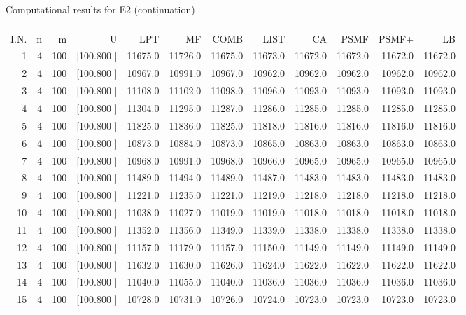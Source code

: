 \documentclass[12pt,a4paper]{article}
\begin{document}
\begin{center}
 Computational results for E2 (continuation) {\tiny
\begin{tabular}{r r r r r r r r r r r r}\hline
    &   &   &          &        &        &        &        &        &        &        &       \\[-0.1in]
  I.N.  &  n  &  m  &  U  &  LPT  &  MF  &  COMB  &  LIST  &  CA  & PSMF &PSMF+ & LB \\[0.03in]
\hline
   1&  4&100&[100.800   ]& 11675.0& 11726.0& 11675.0& 11673.0& 11672.0& 11672.0& 11672.0& 11672.0\\[-0.02in]
   2&  4&100&[100.800   ]& 10967.0& 10991.0& 10967.0& 10962.0& 10962.0& 10962.0& 10962.0& 10962.0\\[-0.02in]
   3&  4&100&[100.800   ]& 11108.0& 11102.0& 11098.0& 11096.0& 11093.0& 11093.0& 11093.0& 11093.0\\[-0.02in]
   4&  4&100&[100.800   ]& 11304.0& 11295.0& 11287.0& 11286.0& 11285.0& 11285.0& 11285.0& 11285.0\\[-0.02in]
   5&  4&100&[100.800   ]& 11825.0& 11836.0& 11825.0& 11818.0& 11816.0& 11816.0& 11816.0& 11816.0\\[-0.02in]
   6&  4&100&[100.800   ]& 10873.0& 10884.0& 10873.0& 10865.0& 10863.0& 10863.0& 10863.0& 10863.0\\[-0.02in]
   7&  4&100&[100.800   ]& 10968.0& 10991.0& 10968.0& 10966.0& 10965.0& 10965.0& 10965.0& 10965.0\\[-0.02in]
   8&  4&100&[100.800   ]& 11489.0& 11494.0& 11489.0& 11487.0& 11483.0& 11483.0& 11483.0& 11483.0\\[-0.02in]
   9&  4&100&[100.800   ]& 11221.0& 11235.0& 11221.0& 11219.0& 11218.0& 11218.0& 11218.0& 11218.0\\[-0.02in]
  10&  4&100&[100.800   ]& 11038.0& 11027.0& 11019.0& 11019.0& 11018.0& 11018.0& 11018.0& 11018.0\\[-0.02in]
  11&  4&100&[100.800   ]& 11352.0& 11356.0& 11349.0& 11339.0& 11338.0& 11338.0& 11338.0& 11338.0\\[-0.02in]
  12&  4&100&[100.800   ]& 11157.0& 11179.0& 11157.0& 11150.0& 11149.0& 11149.0& 11149.0& 11149.0\\[-0.02in]
  13&  4&100&[100.800   ]& 11632.0& 11630.0& 11626.0& 11624.0& 11622.0& 11622.0& 11622.0& 11622.0\\[-0.02in]
  14&  4&100&[100.800   ]& 11040.0& 11055.0& 11040.0& 11036.0& 11036.0& 11036.0& 11036.0& 11036.0\\[-0.02in]
  15&  4&100&[100.800   ]& 10728.0& 10731.0& 10726.0& 10724.0& 10723.0& 10723.0& 10723.0& 10723.0\\[-0.02in]

\end{tabular}}
\end{center}
\end{document}
